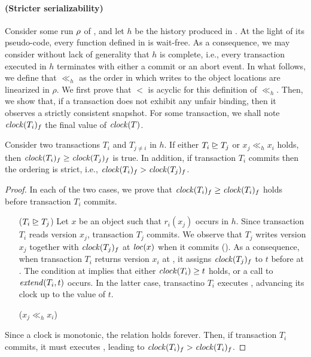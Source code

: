\paragraph{(Stricter serializability)}
Consider some run $\run$ of , and let $h$ be the history produced in \run.
At the light of its pseudo-code, every function defined in  is wait-free.
As a consequence, we may consider without lack of generality that $h$ is complete, i.e., every transaction executed in $h$ terminates with either a commit or an abort event.
In what follows, we define that $\ll_h$ as the order in which writes to the object locations are linearized in $\rho$.
We first prove that $<$ is acyclic for this definition of $\ll_h$.
Then, we show that, if a transaction does not exhibit any unfair binding, then it observes a strictly consistent snapshot.
For some transaction, we shall note $\clockOf{T_i}_f$ the final value of $\clockOf{T}$.

\begin{proposition}
  Consider two transactions $T_i$ and $T_{j \neq i}$ in $h$.
  If either $T_i \mathrel{\unrhd} T_j$ or  $x_j \ll_h x_i$ holds, then $\clockOf{T_i}_f \geq \clockOf{T_j}_f$ is true.
  In addition, if transaction $T_i$ commits then the ordering is strict, i.e., $\clockOf{T_i}_f > \clockOf{T_j}_f$.
\end{proposition}

\begin{proof}

  In each of the two cases, we prove that $\clockOf{T_i}_f \geq \clockOf{T_i}_f$ holds before transaction $T_i$ commits.
  \begin{itemize}
  \item[($T_i \mathrel{\unrhd} T_j$)]
    Let $x$ be an object such that $r_i(x_j)$ occurs in $h$.
    Since transaction $T_i$ reads version $x_j$, transaction $T_j$ commits.
    We observe that $T_j$ writes version $x_j$ together with $\clockOf{T_j}_f$ at $\locationOf{x}$ when it commits ().
    As a consequence, when transaction $T_i$ returns version $x_i$ at , it assigns $\clockOf{T_j}_f$ to $t$ before at .
    The condition at  implies that either $\clockOf{T_i} \geq t$ holds, or a call to $\stmExtend{T_i,t}$ occurs.
    In the latter case, transactino $T_i$ executes , advancing its clock up to the value of $t$.
  \item[($x_j \ll_h x_i$)]
    
  \end{itemize}
  Since a clock is monotonic, the relation holds forever.
  Then, if transaction $T_i$ commits, it must executes , leading to $\clockOf{T_i}_f > \clockOf{T_i}_f$.
\end{proof}

